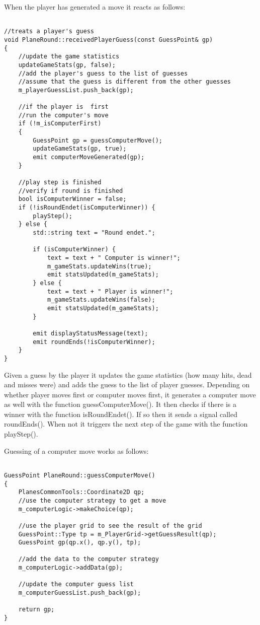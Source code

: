When the player has generated a move it reacts as follows:

\begin{lstlisting}

//treats a player's guess
void PlaneRound::receivedPlayerGuess(const GuessPoint& gp)
{
	//update the game statistics
	updateGameStats(gp, false);
	//add the player's guess to the list of guesses
	//assume that the guess is different from the other guesses
	m_playerGuessList.push_back(gp);
	
	//if the player is  first
	//run the computer's move
	if (!m_isComputerFirst)
	{
		GuessPoint gp = guessComputerMove();
		updateGameStats(gp, true);
		emit computerMoveGenerated(gp);
	}
	
	//play step is finished
	//verify if round is finished
	bool isComputerWinner = false;
	if (!isRoundEndet(isComputerWinner)) {
		playStep();
	} else {
		std::string text = "Round endet.";
		
		if (isComputerWinner) {
			text = text + " Computer is winner!";
			m_gameStats.updateWins(true);
			emit statsUpdated(m_gameStats);
		} else {
			text = text + " Player is winner!";
			m_gameStats.updateWins(false);
			emit statsUpdated(m_gameStats);
		}
		
		emit displayStatusMessage(text);
		emit roundEnds(!isComputerWinner);
	}
}

\end{lstlisting}

Given a guess by the player it updates the game statistics (how many hits, dead and misses were) and adds the guess to the list of player guesses. Depending on whether player moves first or computer moves first, it generates a computer move as well with the function guessComputerMove(). It then checks if there is a winner with the function isRoundEndet(). If so then it sends a signal called roundEnds(). When not it triggers the next step of the game with the function playStep().

Guessing of a computer move works as follows:

\begin{lstlisting}

GuessPoint PlaneRound::guessComputerMove()
{
	PlanesCommonTools::Coordinate2D qp;
	//use the computer strategy to get a move
	m_computerLogic->makeChoice(qp);
	
	//use the player grid to see the result of the grid
	GuessPoint::Type tp = m_PlayerGrid->getGuessResult(qp);
	GuessPoint gp(qp.x(), qp.y(), tp);
	
	//add the data to the computer strategy
	m_computerLogic->addData(gp);
	
	//update the computer guess list
	m_computerGuessList.push_back(gp);
	
	return gp;
}

\end{lstlisting}

